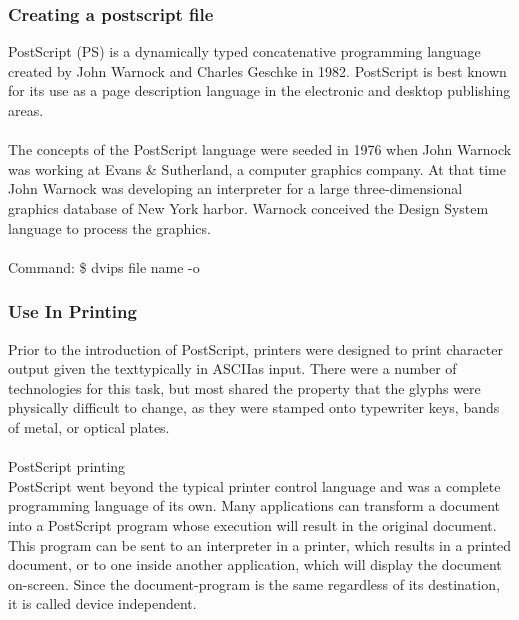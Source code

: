 \subsubsection{Creating a postscript file}
PostScript (PS) is a dynamically typed concatenative programming language created by John Warnock and Charles Geschke in 1982. PostScript is best known for its use as a
page description language in the electronic and desktop publishing areas.\\\\
The concepts of the PostScript language were seeded in 1976 when John Warnock was working at Evans \& Sutherland, a computer graphics company. At that time John Warnock was developing an interpreter for a large three-dimensional graphics database of New York harbor. Warnock conceived the Design System language to process the graphics.\\
\\

Command: \$ dvips file name -o

\subsubsection{Use In Printing}
Prior to the introduction of PostScript, printers were designed to print character output given the texttypically in ASCIIas input. There were a number of technologies for this task, but most shared the property that the glyphs were physically difficult to change, as they were stamped onto typewriter keys, bands of metal, or optical plates.\\\\
PostScript printing\\
PostScript went beyond the typical printer control language and was a complete programming language of its own. Many applications can transform a document into a PostScript
program whose execution will result in the original document. This program can be sent to an interpreter in a printer, which results in a printed document, or to one inside another application, which will display the document on-screen. Since the document-program is the same regardless of its destination, it is called device independent.\\


